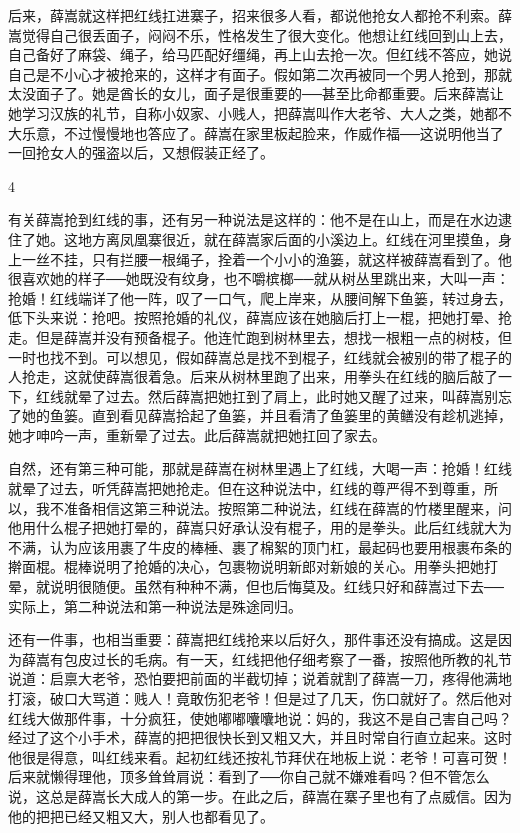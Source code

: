 后来，薛嵩就这样把红线扛进寨子，招来很多人看，都说他抢女人都抢不利索。薛嵩觉得自己很丢面子，闷闷不乐，性格发生了很大变化。他想让红线回到山上去，自己备好了麻袋、绳子，给马匹配好缰绳，再上山去抢一次。但红线不答应，她说自己是不小心才被抢来的，这样才有面子。假如第二次再被同一个男人抢到，那就太没面子了。她是酋长的女儿，面子是很重要的──甚至比命都重要。后来薛嵩让她学习汉族的礼节，自称小奴家、小贱人，把薛嵩叫作大老爷、大人之类，她都不大乐意，不过慢慢地也答应了。薛嵩在家里板起脸来，作威作福──这说明他当了一回抢女人的强盗以后，又想假装正经了。 

4 

有关薛嵩抢到红线的事，还有另一种说法是这样的：他不是在山上，而是在水边逮住了她。这地方离凤凰寨很近，就在薛嵩家后面的小溪边上。红线在河里摸鱼，身上一丝不挂，只有拦腰一根绳子，拴着一个小小的渔篓，就这样被薛嵩看到了。他很喜欢她的样子──她既没有纹身，也不嚼槟榔──就从树丛里跳出来，大叫一声：抢婚！红线端详了他一阵，叹了一口气，爬上岸来，从腰间解下鱼篓，转过身去，低下头来说：抢吧。按照抢婚的礼仪，薛嵩应该在她脑后打上一棍，把她打晕、抢走。但是薛嵩并没有预备棍子。他连忙跑到树林里去，想找一根粗一点的树枝，但一时也找不到。可以想见，假如薛嵩总是找不到棍子，红线就会被别的带了棍子的人抢走，这就使薛嵩很着急。后来从树林里跑了出来，用拳头在红线的脑后敲了一下，红线就晕了过去。然后薛嵩把她扛到了肩上，此时她又醒了过来，叫薛嵩别忘了她的鱼篓。直到看见薛嵩拾起了鱼篓，并且看清了鱼篓里的黄鳝没有趁机逃掉，她才呻吟一声，重新晕了过去。此后薛嵩就把她扛回了家去。 

自然，还有第三种可能，那就是薛嵩在树林里遇上了红线，大喝一声：抢婚！红线就晕了过去，听凭薛嵩把她抢走。但在这种说法中，红线的尊严得不到尊重，所以，我不准备相信这第三种说法。按照第二种说法，红线在薛嵩的竹楼里醒来，问他用什么棍子把她打晕的，薛嵩只好承认没有棍子，用的是拳头。此后红线就大为不满，认为应该用裹了牛皮的棒棰、裹了棉絮的顶门杠，最起码也要用根裹布条的擀面棍。棍棒说明了抢婚的决心，包裹物说明新郎对新娘的关心。用拳头把她打晕，就说明很随便。虽然有种种不满，但也后悔莫及。红线只好和薛嵩过下去──实际上，第二种说法和第一种说法是殊途同归。 

还有一件事，也相当重要：薛嵩把红线抢来以后好久，那件事还没有搞成。这是因为薛嵩有包皮过长的毛病。有一天，红线把他仔细考察了一番，按照他所教的礼节说道：启禀大老爷，恐怕要把前面的半截切掉；说着就割了薛嵩一刀，疼得他满地打滚，破口大骂道：贱人！竟敢伤犯老爷！但是过了几天，伤口就好了。然后他对红线大做那件事，十分疯狂，使她嘟嘟囔囔地说：妈的，我这不是自己害自己吗？经过了这个小手术，薛嵩的把把很快长到又粗又大，并且时常自行直立起来。这时他很是得意，叫红线来看。起初红线还按礼节拜伏在地板上说：老爷！可喜可贺！后来就懒得理他，顶多耸耸肩说：看到了──你自己就不嫌难看吗？但不管怎么说，这总是薛嵩长大成人的第一步。在此之后，薛嵩在寨子里也有了点威信。因为他的把把已经又粗又大，别人也都看见了。 

